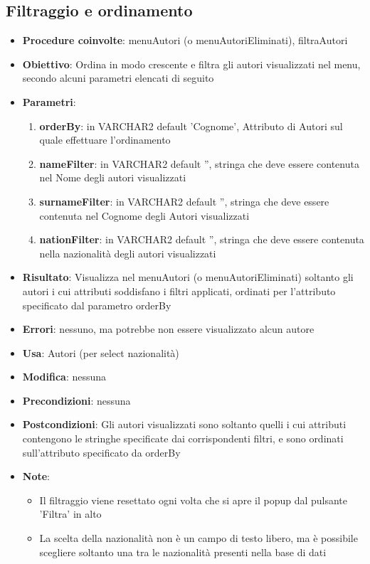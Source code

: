 \subsection{Filtraggio e ordinamento}
\begin{itemize}
	\item \textbf{Procedure coinvolte}: menuAutori (o menuAutoriEliminati), filtraAutori
	\item \textbf{Obiettivo}: Ordina in modo crescente e filtra gli autori visualizzati nel menu, secondo alcuni parametri elencati di seguito
	\item \textbf{Parametri}:
	\begin{enumerate}
		\item \textbf{orderBy}: in VARCHAR2 default 'Cognome', Attributo di Autori sul quale effettuare l'ordinamento
		\item \textbf{nameFilter}: in VARCHAR2 default '', stringa che deve essere contenuta nel Nome degli autori visualizzati
		\item \textbf{surnameFilter}: in VARCHAR2 default '', stringa che deve essere contenuta nel Cognome degli Autori visualizzati
		\item \textbf{nationFilter}: in VARCHAR2 default '', stringa che deve essere contenuta nella nazionalità degli autori visualizzati
	\end{enumerate}
	\item \textbf{Risultato}: Visualizza nel menuAutori (o menuAutoriEliminati) soltanto gli autori i cui attributi soddisfano i filtri applicati, ordinati per l'attributo specificato dal parametro orderBy
	\item \textbf{Errori}: nessuno, ma potrebbe non essere visualizzato alcun autore
	\item \textbf{Usa}: Autori (per select nazionalità)
	\item \textbf{Modifica}: nessuna
	\item \textbf{Precondizioni}: nessuna
	\item \textbf{Postcondizioni}: Gli autori visualizzati sono soltanto quelli
	i cui attributi contengono le stringhe specificate dai corrispondenti filtri, e sono ordinati sull'attributo specificato da orderBy
	\item \textbf{Note}:
	\begin{itemize}
		\item Il filtraggio viene resettato ogni volta che si apre il popup dal pulsante 'Filtra' in alto
		\item La scelta della nazionalità non è un campo di testo libero, ma è possibile scegliere soltanto una tra le nazionalità presenti nella base di dati

\end{itemize}
\end{itemize}
